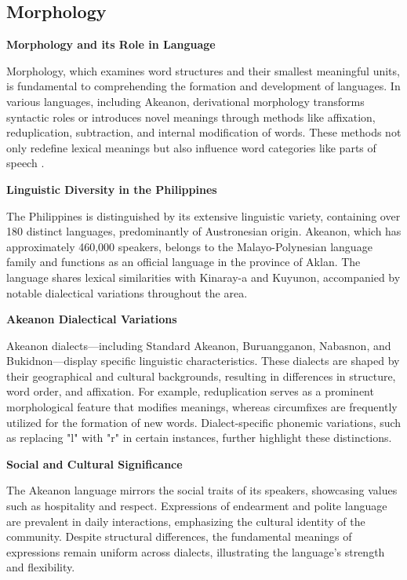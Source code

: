 \subsection{Morphology}

\textbf{Morphology and its Role in Language}

Morphology, which examines word structures and their smallest meaningful units, is fundamental to comprehending the formation and development of languages. In various languages, including Akeanon, derivational morphology transforms syntactic roles or introduces novel meanings through methods like affixation, reduplication, subtraction, and internal modification of words. These methods not only redefine lexical meanings but also influence word categories like parts of speech .

\textbf{Linguistic Diversity in the Philippines}

The Philippines is distinguished by its extensive linguistic variety, containing over 180 distinct languages, predominantly of Austronesian origin. Akeanon, which has approximately 460,000 speakers, belongs to the Malayo-Polynesian language family and functions as an official language in the province of Aklan. The language shares lexical similarities with Kinaray-a and Kuyunon, accompanied by notable dialectical variations throughout the area.

\textbf{Akeanon Dialectical Variations}

Akeanon dialects—including Standard Akeanon, Buruangganon, Nabasnon, and Bukidnon—display specific linguistic characteristics. These dialects are shaped by their geographical and cultural backgrounds, resulting in differences in structure, word order, and affixation. For example, reduplication serves as a prominent morphological feature that modifies meanings, whereas circumfixes are frequently utilized for the formation of new words. Dialect-specific phonemic variations, such as replacing "l" with "r" in certain instances, further highlight these distinctions.

\textbf{Social and Cultural Significance}

The Akeanon language mirrors the social traits of its speakers, showcasing values such as hospitality and respect. Expressions of endearment and polite language are prevalent in daily interactions, emphasizing the cultural identity of the community. Despite structural differences, the fundamental meanings of expressions remain uniform across dialects, illustrating the language’s strength and flexibility.

